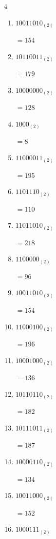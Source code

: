 \begin{multicols}{4}
\begin{enumerate}
        $=87$

  \item $10011010_{(2)}$

        $=154$

  \item $10110011_{(2)}$

        $=179$

  \item $10000000_{(2)}$

        $=128$

  \item $1000_{(2)}$

        $=8$

  \item $11000011_{(2)}$

        $=195$

  \item $1101110_{(2)}$

        $=110$

  \item $11011010_{(2)}$

        $=218$

  \item $1100000_{(2)}$

        $=96$

\columnbreak %

  \item $10011010_{(2)}$

        $=154$

  \item $11000100_{(2)}$

        $=196$

  \item $10001000_{(2)}$

        $=136$

  \item $10110110_{(2)}$

        $=182$

  \item $10111011_{(2)}$

        $=187$

  \item $10000110_{(2)}$

        $=134$

  \item $10011000_{(2)}$

        $=152$

  \item $1000111_{(2)}$


\end{enumerate}
\end{multicols}
